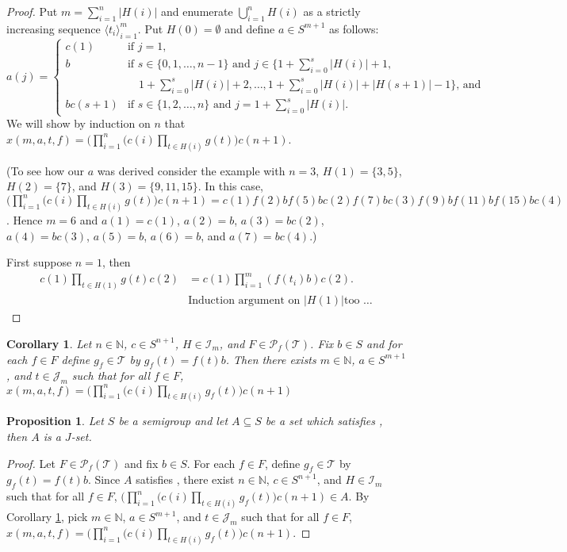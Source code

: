 \documentclass[12pt]{article}
\theoremstyle{plain}
\newtheorem{cor}[thm]{Corollary}
\newtheorem{prop}[thm]{Proposition}
\theoremstyle{definition}
\newcommand{\la}{\langle}
\newcommand{\ra}{\rangle}
\newcommand{\bbN}{\mathbb{N}}
\newcommand{\calI}{\mathcal{I}}
\newcommand{\calJ}{\mathcal{J}}
\newcommand{\calT}{\mathcal{T}}
\newcommand{\Pf}{\mathcal{P}_f}
\begin{document}
\begin{proof}
  Put $m = \sum_{i=1}^n |H(i)|$ and enumerate $\bigcup_{i=1}^n H(i)$
  as a strictly increasing sequence $\la t_i \ra_{i=1}^m$. 
  Put $H(0) = \emptyset$ and define $a \in S^{m+1}$ as follows:
  \[
    a(j) =
    \begin{cases}
      c(1) & \mbox{if $j = 1$,} \\
      b    & \mbox{if $s \in \{0, 1, \ldots, n-1\}$ and $j \in \{1 +
        \sum_{i=0}^s |H(i)| + 1,$}\\
      & \hspace{1em}\mbox{$1 + \sum_{i=0}^s |H(i)| + 2, \ldots,
        1 + \sum_{i=0}^s |H(i)| + |H(s+1)| - 1\}$, and} \\
      bc(s+1) & \mbox{if $s \in \{1, 2, \ldots, n\}$ and $j = 1 +
        \sum_{i=0}^s |H(i)|$.} 
    \end{cases}
  \]
  We will show by induction on $n$ that $x(m, a, t, f) =
  \bigl(\prod_{i=1}^n( c(i) \prod_{t \in H(i)} g(t)\bigr) c(n+1)$. 

  (To see how our $a$ was derived consider the example with $n = 3$,
  $H(1) = \{3, 5\}$, $H(2) = \{7\}$, and $H(3) = \{9, 11, 15\}$.
  In this case, $\bigl(\prod_{i=1}^n( c(i) \prod_{t \in H(i)}
  g(t)\bigr) c(n+1) =
  c(1)f(2)bf(5)bc(2)f(7)bc(3)f(9)bf(11)bf(15)bc(4)$.
  Hence $m = 6$ and $a(1) = c(1)$, $a(2) = b$, $a(3) = bc(2)$, $a(4) =
  bc(3)$, $a(5) = b$, $a(6) = b$, and $a(7) = bc(4)$.)

  First suppose $n = 1$, then
  \begin{align*}
    c(1) \prod_{t \in H(1)} g(t) c(2) &= c(1) \prod_{i=1}^m (f(t_i) b)
    c(2). \\
    &\mbox{Induction argument on $|H(1)|$
      too \ldots}
  \end{align*}
\end{proof}
\begin{cor}
  \label{cor:stJsets}
  Let $n \in \bbN$, $c \in S^{n+1}$, $H \in \calI_m$, and $F \in
  \Pf(\calT)$. 
  Fix $b \in S$ and for each $f \in F$ define $g_f \in \calT$ by
  $g_f(t) = f(t)b$. 
  Then there exists $m \in \bbN$, $a \in S^{m+1}$, and $t \in \calJ_m$
  such that for all $f \in F$, $x(m, a, t, f) = \bigl(\prod_{i=1}^n(
  c(i) \prod_{t \in H(i)} g_f(t)\bigr) c(n+1)$
\end{cor}

\begin{prop}
  Let $S$ be a semigroup and let $A \subseteq S$ be a set which
  satisfies \cite[Definition 2.3(d)]{Hindman:2010fk}, then $A$ is a $J$-set.
\end{prop}
\begin{proof}
  Let $F \in \Pf(\calT)$ and fix $b \in S$. 
  For each $f \in F$, define $g_f \in \calT$ by $g_f(t) = f(t)b$. 
  Since $A$ satisfies \cite[Definition 2.3(d)]{Hindman:2010fk}, there
  exist $n \in \bbN$, $c \in S^{n+1}$, and $H \in \calI_m$ such that
  for all $f \in F$, $\bigl(\prod_{i=1}^n( c(i) \prod_{t \in H(i)}
  g_f(t)\bigr) c(n+1) \in A$.
  By Corollary \ref{cor:stJsets}, pick $m \in \bbN$, $a \in S^{m+1}$,
  and $t \in \calJ_m$ such that for all $f \in F$, $x(m, a, t, f) =
  \bigl(\prod_{i=1}^n( c(i) \prod_{t \in H(i)} g_f(t)\bigr) c(n+1)$.
\end{proof}
\end{document}
